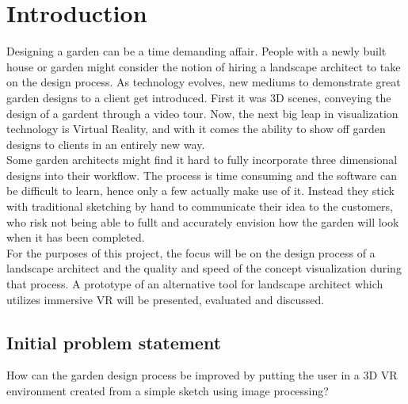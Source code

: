 \chapter{Introduction}
	Designing a garden can be a time demanding affair. People with a newly built house or garden might consider the notion of hiring a landscape architect to take on the design process. As technology evolves, new mediums to demonstrate great garden designs to a client get introduced\cite{landscapeArchitectureDigiTech}. First it was 3D scenes, conveying the design of a gardent through a video tour. Now, the next big leap in visualization technology is Virtual Reality\cite{VRS}, and with it comes the ability to show off garden designs to clients in an entirely new way.\\
	
	Some garden architects might find it hard to fully incorporate three dimensional designs into their workflow. The process is time consuming and the software can be difficult to learn, hence only a few actually make use of it. Instead they stick with traditional sketching by hand to communicate their idea to the customers, who risk not being able to fullt and accurately envision how the garden will look when it has been completed.\\
	
	For the purposes of this project, the focus will be on the design process of a landscape architect and the quality and speed of the concept visualization during that process. A prototype of an alternative tool for landscape architect which utilizes immersive VR will be presented, evaluated and discussed.
	
	
	\section{Initial problem statement}
	How can the garden design process be improved by putting the user in a 3D VR environment created from a simple sketch using image processing?
	